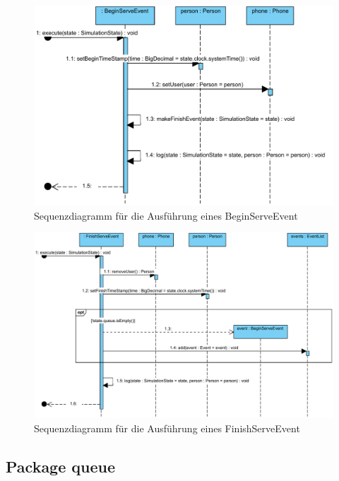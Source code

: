 \begin{figure}[ht]
	\centering
	\includegraphics[scale=0.5]{abbildungen/uml/BeginServe.pdf}
	\caption{Sequenzdiagramm für die Ausführung eines BeginServeEvent}
	\label{fig:beginserve-event}
\end{figure}

\begin{figure}[ht]
	\centering
	\includegraphics[scale=0.5]{abbildungen/uml/FinishServe.pdf}
	\caption{Sequenzdiagramm für die Ausführung eines FinishServeEvent}
	\label{fig:finishserve-event}
\end{figure}

\subsection{Package queue}


